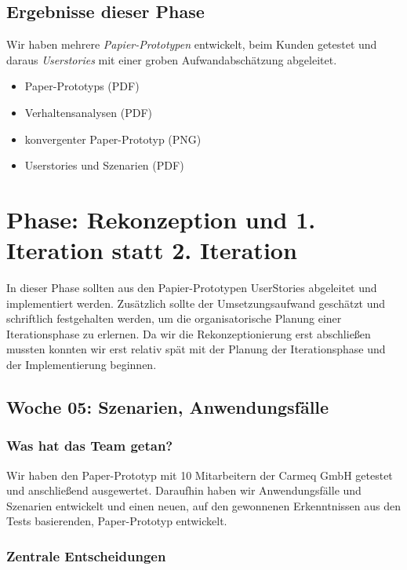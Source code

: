 \documentclass{article}
\begin{document}
\subsection{Ergebnisse dieser Phase}

Wir haben mehrere \textit{Papier-Prototypen} entwickelt, beim Kunden getestet und daraus \textit{Userstories} mit einer groben Aufwandabsch\"atzung abgeleitet.

\begin{itemize}
\item Paper-Prototyps (PDF)
\item Verhaltensanalysen (PDF)
\item konvergenter Paper-Prototyp (PNG)
\item Userstories und Szenarien (PDF)
\end{itemize}


\section{Phase: Rekonzeption und 1. Iteration statt 2. Iteration}

In dieser Phase sollten aus den Papier-Prototypen UserStories abgeleitet und implementiert werden. Zus\"atzlich sollte der Umsetzungsaufwand gesch\"atzt und schriftlich festgehalten werden, um die organisatorische Planung einer Iterationsphase zu erlernen. Da wir die Rekonzeptionierung erst abschlie\ss en mussten konnten wir erst relativ sp\"at mit der Planung der Iterationsphase und der Implementierung beginnen.

\subsection{Woche 05: Szenarien, Anwendungsf\"alle}

\subsubsection{Was hat das Team getan?}

Wir haben den Paper-Prototyp mit 10 Mitarbeitern der Carmeq GmbH getestet und anschlie\ss end ausgewertet. Daraufhin haben wir Anwendungsf\"alle und Szenarien entwickelt und einen neuen, auf den gewonnenen Erkenntnissen aus den Tests basierenden, Paper-Prototyp entwickelt.

\subsubsection{Zentrale Entscheidungen}
\end{document}
